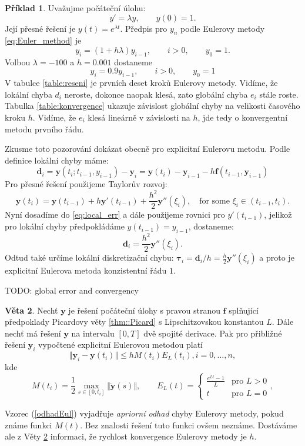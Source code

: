 \documentclass[a4paper, 12pt]{book}
\theoremstyle{definition}
\newtheorem{theorem}{Věta}[section]
\newtheorem{example}[theorem]{Příklad}
\def\vc#1{\mathbf{\boldsymbol{#1}}}     %
\def\norm#1{\bigl\Vert#1\bigr\Vert} %
\begin{document}
\begin{example}
\label{ex:decay}
Uvažujme počáteční úlohu:
\[
  y'=\lambda y,\qquad y(0) =1.
\]
Její přesné řešení je $y(t) = e^{\lambda t}$. Předpis pro $y_n$ podle Eulerovy metody \eqref{eq:Euler_method} je
\[
   y_i = (1+ h\lambda)y_{i-1},\qquad i>0,\qquad y_0=1.
\]
Volbou $\lambda=-100$ a $h=0.001$ dostaneme 
\[
    y_i=0.9y_{i-1}, \qquad i>0,\qquad y_0=1
\]
V tabulce \ref{table:reseni} je prvních deset kroků 
Eulerovy metody. Vidíme, že lokální chyba $d_i$ neroste, dokonce naopak klesá, zato globální chyba $e_i$
stále roste. Tabulka \ref{table:konvergence} ukazuje závislost globální chyby na velikosti časového kroku $h$. 
Vidíme, že $e_i$ klesá lineárně v závislosti na $h$, jde tedy o konvergentní metodu prvního řádu. 


Zkusme toto pozorování dokázat obecně pro explicitní Eulerovu metodu. Podle definice lokální chyby máme:
\begin{equation}
  \label{eq:local_err}
  \vc d_i = \vc y(t_i;t_{i-1}, y_{i-1}) - \vc y_i = \vc y(t_i) - \vc y_{i-1} - h \vc f(t_{i-1}, \vc y_{i-1}) 
\end{equation}
Pro přesné řešení použijeme Taylorův rozvoj:
\[
    \vc y(t_i)=\vc y(t_{i-1})+ h \vc y'(t_{i-1})+\frac{h^2}{2}\vc y''(\xi_i),\quad \text{for some }\xi_i \in (t_{i-1}, t_i).
\]
Nyní dosadíme do \eqref{eq:local_err} a dále použijeme rovnici pro  $y'(t_{i-1})$, jelikož pro lokální chyby předpokládáme  
$y(t_{i-1})=y_{i-1}$, dostaneme:
\[
    \vc d_i = \frac{h^2}{2}\vc y''(\xi_i).
\]
Odtud také určíme lokální diskretizační chybu: $\vc \tau_i = \vc d_i/h = \frac{h}{2}\vc y''(\xi_i)$ a proto je explicitní 
Eulerova metoda konzistentní řádu $1$.

TODO: global error and convergency
\end{example}

\begin{theorem}\label{Veta2.2}
Nechť $\vc y$ je řešení počáteční úlohy s pravou stranou  $\vc f$ splňující předpoklady Picardovy věty \ref{thm::Picard} s Lipschitzovskou konstantou $L$.
Dále nechť má řešení $\vc y$ na intervalu $[ 0, T]$ dvě spojité derivace. Pak pro přibližné řešení  $\vc y_i$ vypočtené explicitní Eulerovou metodou platí
\begin{equation}\label{odhadEul}
\norm{\vc y_i - \vc y(t_i)} \leq h M(t_i) E_L(t_i), i=0,\dots,n,
\end{equation}
kde 
\begin{displaymath}
M(t_i) = \frac 12 \max_{s\in [0,t_i]} \norm{\ddot{\vc{y}}(s)},\qquad
E_L(t)=\left\{\begin{array}{ll}
                \frac{e^{Lt}-1}{L}&\mbox{pro } L>0\\
                t&\mbox{pro } L=0
              \end{array}\right. ,
\end{displaymath}
\end{theorem}
Vzorec (\ref{odhadEul}) vyjadřuje {\em apriorní odhad} chyby Eulerovy metody, 
pokud známe funkci $M(t)$. Bez znalosti řešení tuto funkci ovšem neznáme. 
Dostáváme ale z Věty \ref{Veta2.2} informaci, že rychlost konvergence Eulerovy 
metody je $h$. 
\end{document}

